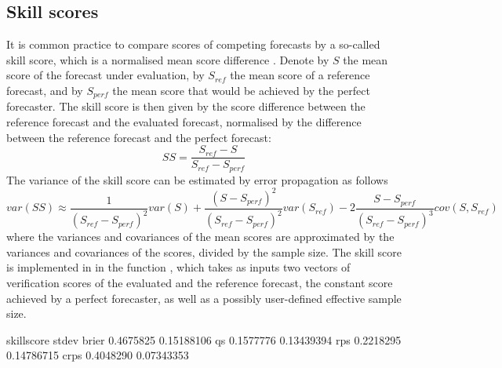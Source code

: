 \documentclass[article]{jss}
\begin{document}
\subsection{Skill scores}

It is common practice to compare scores of competing forecasts by a so-called skill score, which is a normalised mean score difference \citep{wilks2011statistical}.
Denote by $S$ the mean score of the forecast under evaluation, by $S_{ref}$ the mean score of a reference forecast, and by $S_{perf}$ the mean score that would be achieved by the perfect forecaster.
The skill score is then given by the score difference between the reference forecast and the evaluated forecast, normalised by the difference between the reference forecast and the perfect forecast:
%
\begin{equation}
SS = \frac{S_{ref} - S}{S_{ref} - S_{perf}}
\end{equation}
%
The variance of the skill score can be estimated by error propagation as follows
%
\begin{equation}
var(SS) \approx \frac{1}{(S_{ref} - S_{perf})^2} var(S) + \frac{(S - S_{perf})^2}{(S_{ref}-S_{perf})^2} var(S_{ref}) - 2 \frac{S-S_{perf}}{(S_{ref}-S_{perf})^3} cov(S, S_{ref})
\end{equation}
%
where the variances and covariances of the mean scores are approximated by the variances and covariances of the scores, divided by the sample size.
The skill score is implemented in  in the function , which takes as inputs two vectors of verification scores of the evaluated and the reference forecast, the constant score achieved by a perfect forecaster, as well as a possibly user-defined effective sample size.


\begin{Schunk}
\begin{Soutput}
      skillscore      stdev
brier  0.4675825 0.15188106
qs     0.1577776 0.13439394
rps    0.2218295 0.14786715
crps   0.4048290 0.07343353
\end{Soutput}
\end{Schunk}
\end{document}
